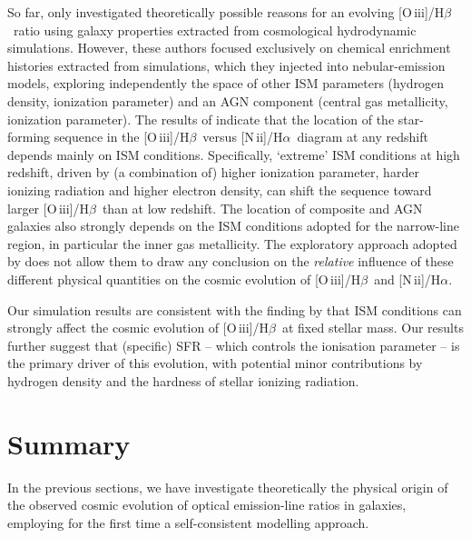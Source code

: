 \documentclass[fleqn,usenatbib]{mnras}
\newcommand{\oiiihb}{\hbox{[O\,{\sc iii}]/H$\beta$}}
\newcommand{\niiha}{\hbox{[N\,{\sc ii}]/H$\alpha$}}
\begin{document}
So far, only \citet{Kewley13} investigated theoretically possible
reasons for an  evolving \oiiihb\ ratio using galaxy properties
extracted from cosmological  hydrodynamic simulations. However, these
authors focused exclusively on chemical enrichment histories extracted
from simulations, which they  injected into nebular-emission models,
exploring independently the space  of other ISM parameters (hydrogen
density, ionization parameter) and an  AGN component (central gas
metallicity, ionization parameter). The results  of \citet{Kewley13}
indicate that the location of the star-forming sequence in the
\oiiihb\ versus \niiha\ diagram at any redshift depends mainly on ISM
conditions. Specifically, `extreme' ISM conditions at high redshift,
driven by (a combination of) higher ionization parameter, harder
ionizing radiation and higher electron density, can shift the sequence
toward larger \oiiihb\ than at  low redshift. The location of
composite and AGN galaxies also strongly depends on the ISM conditions
adopted for the narrow-line region, in particular the inner gas
metallicity. The exploratory approach adopted by \citet{Kewley13}
does not allow them to draw any conclusion on the {\it relative}
influence of  these different physical quantities on the cosmic
evolution of \oiiihb\ and \niiha.  

Our simulation results are consistent with the finding by
\citet{Kewley13} that ISM conditions can strongly affect the cosmic
evolution of \oiiihb\ at fixed stellar  mass. Our results further
suggest that (specific) SFR -- which controls the ionisation
parameter -- is the primary driver of this evolution, with potential
minor contributions by hydrogen density and the hardness of stellar
ionizing radiation.  

\section{Summary}\label{summary} 

In the previous sections, we have investigate theoretically the
physical origin of  the observed cosmic evolution of optical
emission-line ratios in galaxies, employing  for the first time a
self-consistent modelling approach.  
 
\end{document}
